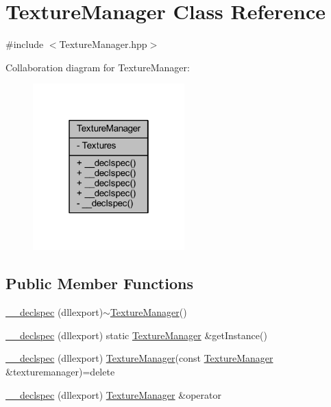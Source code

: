 \hypertarget{class_texture_manager}{\section{Texture\-Manager Class Reference}
\label{class_texture_manager}
}


{\ttfamily \#include $<$Texture\-Manager.\-hpp$>$}



Collaboration diagram for Texture\-Manager\-:\nopagebreak
\begin{figure}[H]
\begin{center}
\leavevmode
\includegraphics[width=166pt]{class_texture_manager__coll__graph}
\end{center}
\end{figure}
\subsection*{Public Member Functions}
\begin{DoxyCompactItemize}
\item 
\hyperlink{class_texture_manager_a5fe39edfdcf5209550c7267d4831e0f0}{\-\_\-\-\_\-declspec} (dllexport)$\sim$\hyperlink{class_texture_manager}{Texture\-Manager}()
\item 
\hyperlink{class_texture_manager_af49a6141f693bf983fb4ee736e84e999}{\-\_\-\-\_\-declspec} (dllexport) static \hyperlink{class_texture_manager}{Texture\-Manager} \&get\-Instance()
\item 
\hyperlink{class_texture_manager_a389de71d534e5361d5c245df2b844608}{\-\_\-\-\_\-declspec} (dllexport) \hyperlink{class_texture_manager}{Texture\-Manager}(const \hyperlink{class_texture_manager}{Texture\-Manager} \&texturemanager)=delete
\item 
\hyperlink{class_texture_manager_a6fa60e485c9e5d1694f99fd49ebe0f4c}{\-\_\-\-\_\-declspec} (dllexport) \hyperlink{class_texture_manager}{Texture\-Manager} \&operator
\end{DoxyCompactItemize}
